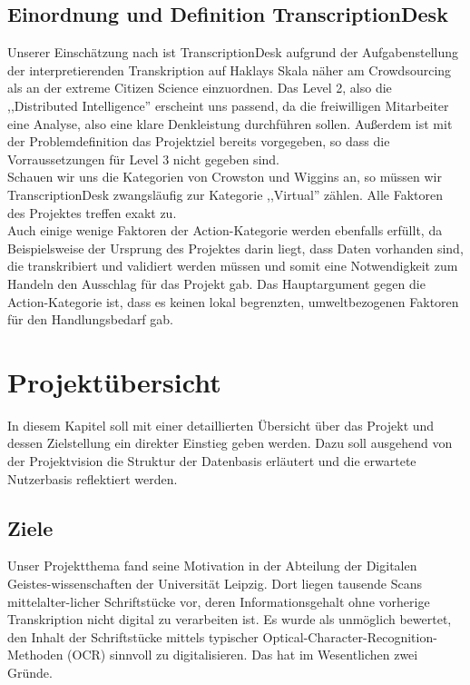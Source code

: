 \documentclass{article}
\begin{document}
\subsection{Einordnung und Definition TranscriptionDesk}
Unserer Einschätzung nach ist TranscriptionDesk aufgrund der Aufgabenstellung der interpretierenden Transkription auf Haklays Skala näher am
Crowdsourcing als an der extreme Citizen Science einzuordnen.
Das Level 2, also die ,,Distributed Intelligence'' erscheint uns passend, da die freiwilligen Mitarbeiter 
eine Analyse, also eine klare Denkleistung durchführen sollen.
Außerdem ist mit der Problemdefinition das Projektziel bereits vorgegeben, so dass die Vorraussetzungen für Level 3 nicht gegeben sind.\\
Schauen wir uns die Kategorien von Crowston und Wiggins an, so müssen wir TranscriptionDesk zwangsläufig zur Kategorie ,,Virtual'' zählen.
Alle Faktoren des Projektes treffen exakt zu.\\
Auch einige wenige Faktoren der Action-Kategorie werden ebenfalls erfüllt, da Beispielsweise der Ursprung des Projektes darin liegt,
dass Daten vorhanden sind, die transkribiert und validiert werden müssen und somit eine Notwendigkeit zum Handeln 
den Ausschlag für das Projekt gab.
Das Hauptargument gegen die Action-Kategorie ist, dass es keinen lokal begrenzten, umweltbezogenen Faktoren für den Handlungsbedarf gab.

\section{Projektübersicht}
In diesem Kapitel soll mit einer detaillierten Übersicht über das Projekt und dessen Zielstellung ein direkter Einstieg geben werden.
Dazu soll ausgehend von der Projektvision die Struktur der Datenbasis erläutert und die erwartete Nutzerbasis reflektiert werden.

\subsection{Ziele}
Unser Projektthema fand seine Motivation in der Abteilung der Digitalen Geistes-wissenschaften der Universität Leipzig.
Dort liegen tausende Scans mittelalter-licher Schriftstücke vor, deren Informationsgehalt ohne vorherige Transkription nicht digital zu verarbeiten ist.
Es wurde als unmöglich bewertet, den Inhalt der Schriftstücke mittels typischer Optical-Character-Recognition-Methoden (OCR) sinnvoll zu digitalisieren.
Das hat im Wesentlichen zwei Gründe.
\end{document}
